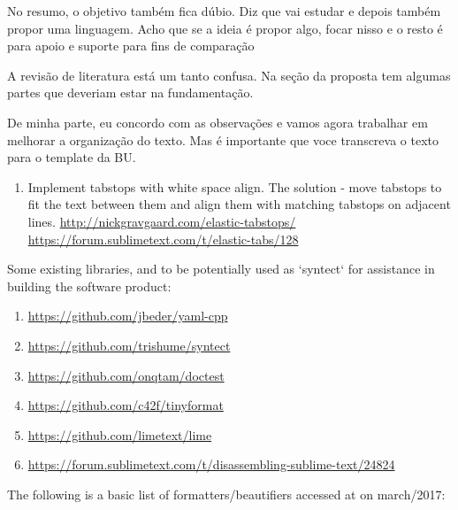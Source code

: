 No resumo, o objetivo também fica dúbio. Diz que vai estudar e depois
também propor uma linguagem. Acho que se a ideia é propor algo, focar
nisso e o resto é para apoio e suporte para fins de comparação

A revisão de literatura está um tanto confusa. Na seção da proposta
tem algumas partes que deveriam estar na fundamentação.

De minha parte, eu concordo com as observações e vamos agora trabalhar
em melhorar a organização do texto. Mas é importante que voce
transcreva o texto para o template da BU.


\medskip
\begin{bluebox}
\begin{enumerate}[leftmargin=*]

    \item Implement tabstops with white space align. The solution - move
    tabstops to fit the text between them and align them with matching tabstops
    on adjacent lines. \url{http://nickgravgaard.com/elastic-tabstops/}
    \url{https://forum.sublimetext.com/t/elastic-tabs/128}

\end{enumerate}
\end{bluebox}

Some existing libraries,
and to be potentially used as `syntect` for assistance in building the software product:

\begin{bluebox}
\begin{enumerate}[leftmargin=*,parsep=0pt]

    \item \url{https://github.com/jbeder/yaml-cpp}
    \item \url{https://github.com/trishume/syntect}
    \item \url{https://github.com/onqtam/doctest}
    \item \url{https://github.com/c42f/tinyformat}
    \item \url{https://github.com/limetext/lime}
    \item \url{https://forum.sublimetext.com/t/disassembling-sublime-text/24824}

\end{enumerate}
\end{bluebox}

The following is a basic list of formatters/beautifiers accessed at
 on march/2017:

